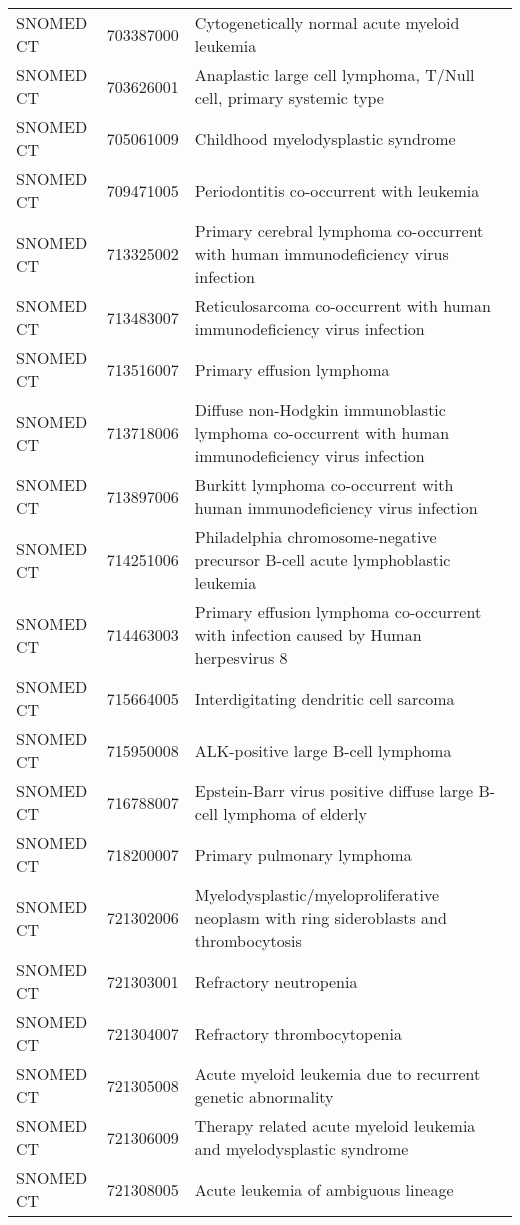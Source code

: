 \begin{longtable}{p{}p{}p{}}
  SNOMED CT & 703387000 & Cytogenetically normal acute myeloid leukemia \\ 
  SNOMED CT & 703626001 & Anaplastic large cell lymphoma, T/Null cell, primary systemic type \\ 
  SNOMED CT & 705061009 & Childhood myelodysplastic syndrome \\ 
  SNOMED CT & 709471005 & Periodontitis co-occurrent with leukemia \\ 
  SNOMED CT & 713325002 & Primary cerebral lymphoma co-occurrent with human immunodeficiency virus infection \\ 
  SNOMED CT & 713483007 & Reticulosarcoma co-occurrent with human immunodeficiency virus infection \\ 
  SNOMED CT & 713516007 & Primary effusion lymphoma \\ 
  SNOMED CT & 713718006 & Diffuse non-Hodgkin immunoblastic lymphoma co-occurrent with human immunodeficiency virus infection \\ 
  SNOMED CT & 713897006 & Burkitt lymphoma co-occurrent with human immunodeficiency virus infection \\ 
  SNOMED CT & 714251006 & Philadelphia chromosome-negative precursor B-cell acute lymphoblastic leukemia \\ 
  SNOMED CT & 714463003 & Primary effusion lymphoma co-occurrent with infection caused by Human herpesvirus 8 \\ 
  SNOMED CT & 715664005 & Interdigitating dendritic cell sarcoma \\ 
  SNOMED CT & 715950008 & ALK-positive large B-cell lymphoma \\ 
  SNOMED CT & 716788007 & Epstein-Barr virus positive diffuse large B-cell lymphoma of elderly \\ 
  SNOMED CT & 718200007 & Primary pulmonary lymphoma \\ 
  SNOMED CT & 721302006 & Myelodysplastic/myeloproliferative neoplasm with ring sideroblasts and thrombocytosis \\ 
  SNOMED CT & 721303001 & Refractory neutropenia \\ 
  SNOMED CT & 721304007 & Refractory thrombocytopenia \\ 
  SNOMED CT & 721305008 & Acute myeloid leukemia due to recurrent genetic abnormality \\ 
  SNOMED CT & 721306009 & Therapy related acute myeloid leukemia and myelodysplastic syndrome \\ 
  SNOMED CT & 721308005 & Acute leukemia of ambiguous lineage \\ 

\end{longtable}
